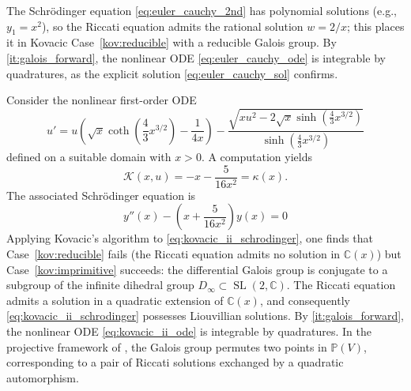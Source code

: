 \documentclass[preprint,a4paper]{elsarticle}
\begin{document}
\begin{example}\label{ex:euler_cauchy_galois}
The Schr\"odinger equation \eqref{eq:euler_cauchy_2nd} has polynomial solutions (e.g., $y_1=x^2$), so the Riccati equation admits the rational solution $w=2/x$; this places it in Kovacic Case~\ref{kov:reducible} with a reducible Galois group. By \ref{it:galois_forward}, the nonlinear ODE \eqref{eq:euler_cauchy_ode} is integrable by quadratures, as the explicit solution \eqref{eq:euler_cauchy_sol} confirms.
\end{example}

\begin{example}\label{ex:kovacic_ii}
Consider the nonlinear first-order ODE
\begin{equation}\label{eq:kovacic_ii_ode}
u' = u \left( \sqrt{x} \coth \left( \frac{4}{3}x^{3/2} \right) - \frac{1}{4x} \right) - \frac{\sqrt{x u^2 - 2\sqrt{x} \sinh \left( \frac{4}{3}x^{3/2} \right)}}{\sinh \left( \frac{4}{3}x^{3/2} \right)}
\end{equation}
defined on a suitable domain with $x>0$. A computation yields 
\[
\mathcal{K}(x,u) = -x - \frac{5}{16x^2} = \kappa(x).
\]
The associated Schr\"odinger equation is
\begin{equation}\label{eq:kovacic_ii_schrodinger}
y''(x) - \left( x + \frac{5}{16x^2} \right) y(x) = 0
\end{equation}
Applying Kovacic's algorithm to \eqref{eq:kovacic_ii_schrodinger}, one finds that Case~\ref{kov:reducible} fails (the Riccati equation admits no solution in $\mathbb{C}(x)$) but Case~\ref{kov:imprimitive} succeeds: the differential Galois group is conjugate to a subgroup of the infinite dihedral group $D_\infty\subset\operatorname{SL}(2,\mathbb{C})$. The Riccati equation admits a solution in a quadratic extension of $\mathbb{C}(x)$, and consequently \eqref{eq:kovacic_ii_schrodinger} possesses Liouvillian solutions. By \ref{it:galois_forward}, the nonlinear ODE \eqref{eq:kovacic_ii_ode} is integrable by quadratures. In the projective framework of , the Galois group permutes two points in $\mathbb{P}(V)$, corresponding to a pair of Riccati solutions exchanged by a quadratic automorphism.
\end{example}
\end{document}
